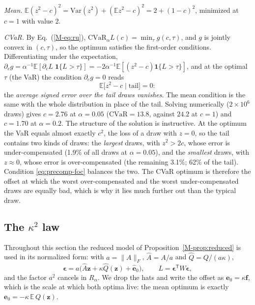 \documentclass[aps,pra,onecolumn,notitlepage,superscriptaddress,nofootinbib,floatfix]{revtex4-2}
\newcommand{\cvar}{\mathrm{CVaR}}
\newcommand{\E}{\mathbb{E}}
\begin{document}
\emph{Mean.} $\E(z^2-c)^2=\mathrm{Var}(z^2)+(\E z^2-c)^2=2+(1-c)^2$, minimized
at $c=1$ with value 2.

\emph{CVaR.} By Eq.~(\ref{M-eq:ru}), $\cvar_\alpha L(c)=\min_\tau g(c,\tau)$,
and $g$ is jointly convex in $(c,\tau)$, so the optimum satisfies the
first-order conditions. Differentiating under the expectation,
$\partial_cg=\alpha^{-1}\E[\partial_cL\;\mathbf 1\{L>\tau\}]=-2\alpha^{-1}\E[(z^2-c)\mathbf 1\{L>\tau\}]$,
and at the optimal $\tau$ (the VaR) the condition $\partial_cg=0$ reads
\begin{equation}
\E\big[z^2-c\;\big|\;\text{tail}\big]=0 :
\label{eq:precomp-foc}
\end{equation}
the \emph{average signed error over the tail draws vanishes}. The mean
condition is the same with the whole distribution in place of the tail.
Solving numerically ($2\times10^6$ draws) gives $c=2.76$ at $\alpha=0.05$
($\cvar=13.8$, against $24.2$ at $c=1$) and $c=1.70$ at $\alpha=0.2$. The
structure of the solution is instructive. At the optimum the VaR equals
almost exactly $c^2$, the loss of a draw with $z=0$, so the tail contains two
kinds of draws: the \emph{largest} draws, with $z^2>2c$, whose error is
under-compensated (1.9\% of all draws at $\alpha=0.05$), and the
\emph{smallest} draws, with $z\approx0$, whose error is over-compensated (the
remaining 3.1\%; 62\% of the tail). Condition \eqref{eq:precomp-foc} balances
the two. The CVaR optimum is therefore the offset at which the worst
over-compensated and the worst under-compensated draws are equally bad, which
is why it lies much further out than the typical draw.


\subsection{The $\kappa^2$ law}
\label{sec:proofs-kappa2}

Throughout this section the reduced model of
Proposition~\ref{M-prop:reduced} is used in its normalized form: with
$a=\|A\|_F$, $\hat A=A/a$ and $\hat Q=Q/(a\kappa)$,
\[
\bm\epsilon=a\big(\hat A\mathbf z+\kappa\hat Q(\mathbf z)+\hat{\mathbf e}_0\big),
\qquad L=\bm\epsilon^{\mathsf T}W\bm\epsilon ,
\]
and the factor $a^2$ cancels in $R_\alpha$. We drop the hats and write the
offset as $\mathbf e_0=\kappa\mathbf f$, which is the scale at which both
optima live: the mean optimum is exactly
$\mathbf e_0=-\kappa\,\E\,Q(\mathbf z)$.
\end{document}
